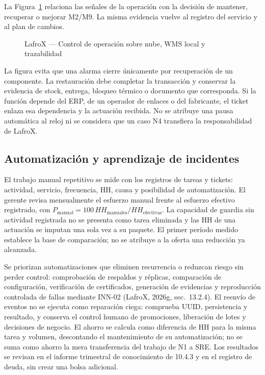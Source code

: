 La Figura~\ref{fig:sd11-operacion} relaciona las señales de la operación con la decisión de mantener, recuperar o mejorar M2/M9. La misma evidencia vuelve al registro del servicio y al plan de cambios.

\begin{figure}[H]
\centering

\caption{LafroX — Control de operación sobre nube, WMS local y trazabilidad}
\label{fig:sd11-operacion}
\end{figure}

La figura evita que una alarma cierre únicamente por recuperación de un componente. La restauración debe completar la transacción y conservar la evidencia de stock, entrega, bloqueo térmico o documento que corresponda. Si la función depende del ERP, de un operador de enlaces o del fabricante, el ticket enlaza esa dependencia y la actuación recibida. No se atribuye una pausa automática al reloj ni se considera que un caso N4 transfiera la responsabilidad de LafroX.

\subsection{Automatización y aprendizaje de incidentes}
\label{subsec:sd11-mejora}

El trabajo manual repetitivo se mide con los registros de tareas y tickets: actividad, servicio, frecuencia, HH, causa y posibilidad de automatización. El gerente revisa mensualmente el esfuerzo manual frente al esfuerzo efectivo registrado, con $P_\mathrm{manual}=100\,HH_\mathrm{manuales}/HH_\mathrm{efectivas}$. La capacidad de guardia sin actividad registrada no se presenta como tarea eliminada y las HH de una actuación se imputan una sola vez a su paquete. El primer período medido establece la base de comparación; no se atribuye a la oferta una reducción ya alcanzada.

Se priorizan automatizaciones que eliminen recurrencia o reduzcan riesgo sin perder control: comprobación de respaldos y réplicas, comparación de configuración, verificación de certificados, generación de evidencias y reproducción controlada de fallas mediante INN-02 (LafroX, 2026g, sec.~13.2.4). El reenvío de eventos no se ejecuta como reparación ciega: comprueba UUID, persistencia y resultado, y conserva el control humano de promociones, liberación de lotes y decisiones de negocio. El ahorro se calcula como diferencia de HH para la misma tarea y volumen, descontando el mantenimiento de su automatización; no se suma como ahorro la mera transferencia del trabajo de N1 a SRE. Los resultados se revisan en el informe trimestral de conocimiento de 10.4.3 y en el registro de deuda, sin crear una bolsa adicional.

